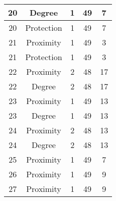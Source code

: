 \documentclass[results.tex]{subfiles}
\begin{document}
\begin{center}
\begin{tabular}{| c || c | c | c | c |}
            \hline
            20                      & Degree                       & 1                      & 49                      & 7                    \\
            \hline
            20                      & Protection                   & 1                      & 49                      & 7                    \\
            \hline
            21                      & Proximity                    & 1                      & 49                      & 3                    \\
            \hline
            21                      & Protection                   & 1                      & 49                      & 3                    \\
            \hline
            22                      & Proximity                    & 2                      & 48                      & 17                   \\
            \hline
            22                      & Degree                       & 2                      & 48                      & 17                   \\
            \hline
            23                      & Proximity                    & 1                      & 49                      & 13                   \\
            \hline
            23                      & Degree                       & 1                      & 49                      & 13                   \\
            \hline
            24                      & Proximity                    & 2                      & 48                      & 13                   \\
            \hline
            24                      & Degree                       & 2                      & 48                      & 13                   \\
            \hline
            25                      & Proximity                    & 1                      & 49                      & 7                    \\
            \hline
            26                      & Proximity                    & 1                      & 49                      & 9                    \\
            \hline
            27                      & Proximity                    & 1                      & 49                      & 9                    \\

\end{tabular}
\end{center}
\end{document}
